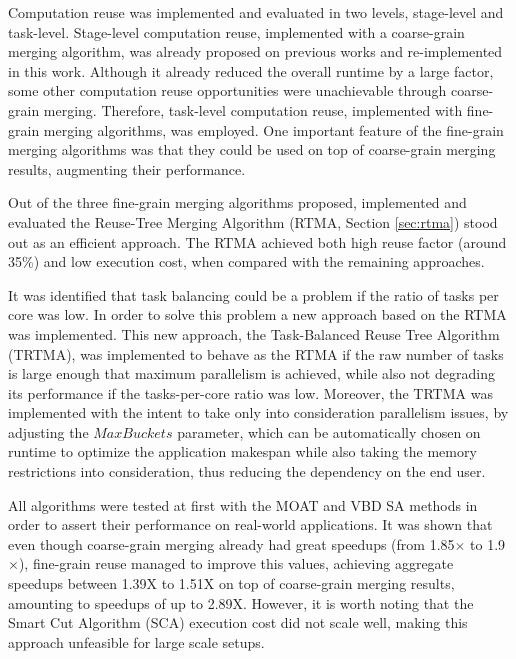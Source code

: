 Computation reuse was implemented and evaluated in two levels, stage-level and task-level. Stage-level computation reuse, implemented with a coarse-grain merging algorithm, was already proposed on previous works \cite{rtf1,rtf2} and re-implemented in this work. Although it already reduced the overall runtime by a large factor, some other computation reuse opportunities were unachievable through coarse-grain merging. Therefore, task-level computation reuse, implemented with fine-grain merging algorithms, was employed. One important feature of the fine-grain merging algorithms was that they could be used on top of coarse-grain merging results, augmenting their performance.

Out of the three fine-grain merging algorithms proposed, implemented and evaluated the Reuse-Tree Merging Algorithm (RTMA, Section \ref{sec:rtma}) stood out as an efficient approach. The RTMA achieved both high reuse factor (around 35\%) and low execution cost, when compared with the remaining approaches. 


It was identified that task balancing could be a problem if the ratio of tasks per core was low. In order to solve this problem a new approach based on the RTMA was implemented. This new approach, the Task-Balanced Reuse Tree Algorithm (TRTMA), was implemented to behave as the RTMA if the raw number of tasks is large enough that maximum parallelism is achieved, while also not degrading its performance if the tasks-per-core ratio was low. Moreover, the TRTMA was implemented with the intent to take only into consideration parallelism issues, by adjusting the $MaxBuckets$ parameter, which can be automatically chosen on runtime to optimize the application makespan while also taking the memory restrictions into consideration, thus reducing the dependency on the end user.


All algorithms were tested at first with the MOAT and VBD SA methods in order to assert their performance on real-world applications. It was shown that even though coarse-grain merging already had great speedups (from 1.85$\times$ to 1.9$\times$), fine-grain reuse managed to improve this values, achieving aggregate speedups between 1.39X to 1.51X on top of coarse-grain merging results, amounting to speedups of up to 2.89X. However, it is worth noting that the Smart Cut Algorithm (SCA) execution cost did not scale well, making this approach unfeasible for large scale setups.

